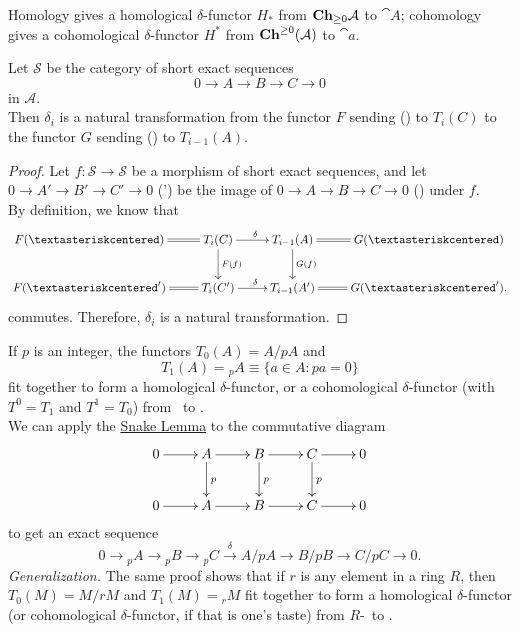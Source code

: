 \begin{example}
	Homology gives a homological $\delta$-functor $H_*$ from $\textrm{\textup{\textbf{Ch}}}_{\geq0}\mathcal{A}$ to $\cat{A}$; cohomology gives a cohomological $\delta$-functor $H^*$ from $\textrm{\textup{\textbf{Ch}}}^{\geq0}(\mathcal{A})$ to $\cat{a}$.
\end{example}

\begin{exercise}
	Let $\mathcal{S}$ be the category of short exact sequences
	\begin{equation}
		0 \rightarrow A \rightarrow B \rightarrow C \rightarrow 0 \tag{\textasteriskcentered}
	\end{equation}
	in $\mathcal{A}$. \\
	Then $\delta_i$ is a natural transformation from the functor $F$ sending (\textasteriskcentered) to $T_i(C)$ to the functor $G$ sending (\textasteriskcentered) to $T_{i-1}(A)$.
\end{exercise}

\begin{proof}
	Let $f:\mathcal{S}\rightarrow\mathcal{S}$ be a morphism of short exact sequences, and let $0 \rightarrow A' \rightarrow B' \rightarrow C' \rightarrow 0$ (\textasteriskcentered') be the image of $0 \rightarrow A \rightarrow B \rightarrow C \rightarrow 0$ (\textasteriskcentered) under $f$. \\
	By definition, we know that
	\[
		\xymatrix{
			F(\textasteriskcentered) \ar@{=}[r] &T_i(C) \ar[r]^{\delta} \ar[d]^{F(f)} &T_{i-1}(A) \ar@{=}[r] \ar[d]^{G(f)} &G(\textasteriskcentered) \\
			F(\textasteriskcentered') \ar@{=}[r] &T_i(C') \ar[r]^{\delta} &T_{i-1}(A') \ar@{=}[r] &G(\textasteriskcentered').
		}
	\]
	commutes.
	Therefore, $\delta_i$ is a natural transformation.
\end{proof}

\begin{example}[p-torsion]
	If $p$ is an integer, the functors $T_0(A)=A/pA$ and 
	$$T_1(A) = {_p}A \equiv \{a\in A:pa=0\}$$
	fit together to form a homological $\delta$-functor, or a cohomological $\delta$-functor (with $T^0=T_1$ and $T^1=T_0$) from \ab\ to \ab.\\
	We can apply the \hyperref[snake_lemma]{Snake Lemma} to the commutative diagram
	\[
		\xymatrix{
			0 \ar[r] &A \ar[r] \ar[d]^p &B \ar[r] \ar[d]^p &C \ar[r] \ar[d]^p &0 \\
			0 \ar[r] &A \ar[r] &B \ar[r] &C \ar[r] &0
		}
	\]
	to get an exact sequence
	$$0 \rightarrow {_p}A \rightarrow {_p}B \rightarrow {_p}C \overset{\delta}{\longrightarrow} A/pA \rightarrow B/pB \rightarrow C/pC \rightarrow 0.$$
	\textit{Generalization.}
	The same proof shows that if $r$ is any element in a ring $R$, then $T_0(M)=M/rM$ and $T_1(M)={_r}M$ fit together to form a homological $\delta$-functor (or cohomological $\delta$-functor, if that is one's taste) from $R$-\Rmod\ to \ab.
\end{example}

